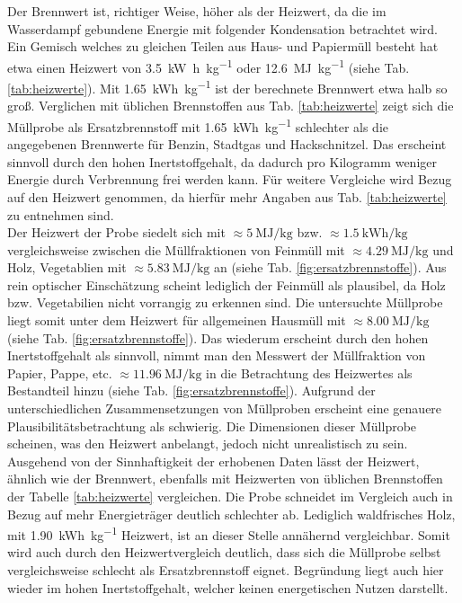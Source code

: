 Der Brennwert ist, richtiger Weise, höher als der Heizwert, da die im Wasserdampf gebundene Energie mit folgender Kondensation betrachtet wird. Ein Gemisch  welches zu gleichen Teilen aus Haus- und Papiermüll besteht hat etwa einen Heizwert von \SI{3,5}{\kilo\watt\hour\per\kilogram} oder \SI{12,6}{\mega\joule\per\kilogram} (siehe Tab. \ref{tab:heizwerte}). Mit \SI{1,65}{\kWh\per\kg} ist der berechnete Brennwert etwa halb so groß. Verglichen mit üblichen Brennstoffen aus Tab. \ref{tab:heizwerte} zeigt sich die Müllprobe als Ersatzbrennstoff mit \SI{1,65}{\kWh\per\kg} schlechter als die angegebenen Brennwerte für Benzin, Stadtgas und Hackschnitzel. Das erscheint sinnvoll durch den hohen Inertstoffgehalt, da dadurch pro Kilogramm weniger Energie durch Verbrennung frei werden kann. Für weitere Vergleiche wird Bezug auf den Heizwert genommen, da hierfür mehr Angaben aus Tab. \ref{tab:heizwerte} zu entnehmen sind.\\ 
Der Heizwert der Probe siedelt sich mit $\approx \SI{5}{\mega \joule \per \kg}$ bzw. $\approx \SI{1,5}{\kWh\per\kg}$ vergleichsweise zwischen die Müllfraktionen von Feinmüll mit $\approx \SI{4,29}{\mega \joule \per \kg}$ und Holz, Vegetablien mit $\approx \SI{5,83}{\mega \joule \per \kg}$ an (siehe Tab. \ref{fig:ersatzbrennstoffe}). Aus rein optischer Einschätzung scheint lediglich der Feinmüll als plausibel, da Holz bzw. Vegetabilien nicht vorrangig zu erkennen sind. Die untersuchte Müllprobe liegt somit unter dem Heizwert für allgemeinen Hausmüll mit $\approx \SI{8,00}{\mega \joule \per \kg}$ (siehe Tab. \ref{fig:ersatzbrennstoffe}). Das wiederum erscheint durch den hohen Inertstoffgehalt als sinnvoll, nimmt man den Messwert der Müllfraktion von Papier, Pappe, etc. $\approx \SI{11,96}{\mega \joule \per \kg}$ in die Betrachtung des Heizwertes als Bestandteil hinzu (siehe Tab. \ref{fig:ersatzbrennstoffe}). Aufgrund der unterschiedlichen Zusammensetzungen von Müllproben erscheint eine genauere Plausibilitätsbetrachtung als schwierig. Die Dimensionen dieser Müllprobe scheinen, was den Heizwert anbelangt, jedoch nicht unrealistisch zu sein.\\
Ausgehend von der Sinnhaftigkeit der erhobenen Daten lässt der Heizwert, ähnlich wie der Brennwert, ebenfalls mit Heizwerten von üblichen Brennstoffen der Tabelle \ref{tab:heizwerte} vergleichen. Die Probe schneidet im Vergleich auch in Bezug auf mehr Energieträger deutlich schlechter ab. Lediglich waldfrisches Holz, mit \SI{1,90}{\kWh\per\kg} Heizwert, ist an dieser Stelle annähernd vergleichbar. Somit wird auch durch den Heizwertvergleich deutlich, dass sich die Müllprobe selbst vergleichsweise schlecht als Ersatzbrennstoff eignet. Begründung liegt auch hier wieder im hohen Inertstoffgehalt, welcher keinen energetischen Nutzen darstellt.\\
